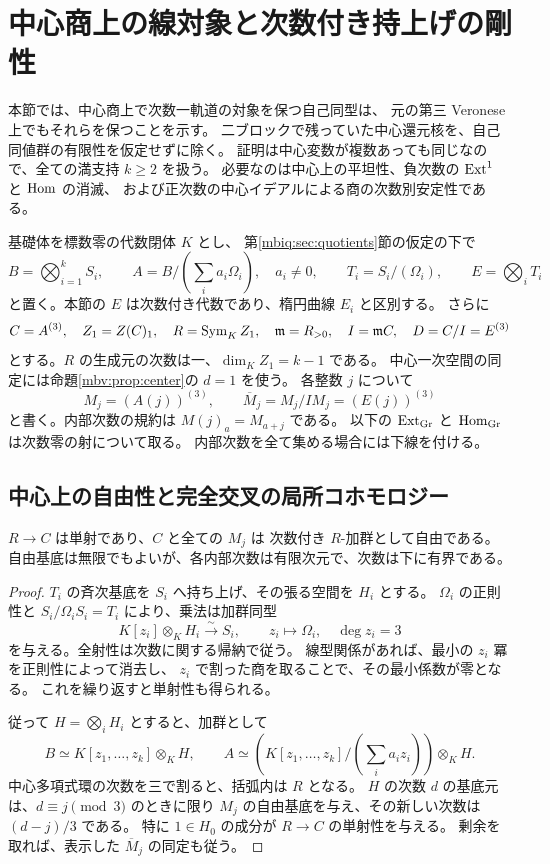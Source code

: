 \section{中心商上の線対象と次数付き持上げの剛性}
\label{mbcr:sec:central-rigidity}

本節では、中心商上で次数一軌道の対象を保つ自己同型は、
元の第三 Veronese 上でもそれらを保つことを示す。
二ブロックで残っていた中心還元核を、自己同値群の有限性を仮定せずに除く。
証明は中心変数が複数あっても同じなので、全ての満支持 $k\geq2$ を扱う。
必要なのは中心上の平坦性、負次数の $\operatorname{Ext}^1$ と $\operatorname{Hom}$ の消滅、
および正次数の中心イデアルによる商の次数別安定性である。

基礎体を標数零の代数閉体 $K$ とし、
第\ref{mbiq:sec:quotients}節の仮定の下で
\[
 B=\bigotimes_{i=1}^kS_i,\qquad
 A=B/\left(\sum_i a_i\Omega_i\right),\quad a_i\ne0,\qquad
 T_i=S_i/(\Omega_i),\qquad E=\bigotimes_iT_i
\]
と置く。本節の $E$ は次数付き代数であり、楕円曲線 $E_i$ と区別する。
さらに
\begin{equation}\label{mbcr:eq:setup}
 C=A^{(3)},\quad Z_1=Z(C)_1,\quad
 R=\operatorname{Sym}_K Z_1,\quad \mathfrak m=R_{>0},\quad I=\mathfrak m C,\quad
 D=C/I=E^{(3)}
\end{equation}
とする。$R$ の生成元の次数は一、$\dim_KZ_1=k-1$ である。
中心一次空間の同定には命題\ref{mbv:prop:center}の $d=1$ を使う。
各整数 $j$ について
\[
 M_j=(A(j))^{(3)},\qquad \overline M_j=M_j/IM_j=(E(j))^{(3)}
\]
と書く。内部次数の規約は $M(j)_a=M_{a+j}$ である。
以下の $\operatorname{Ext}_{\operatorname{Gr}}$ と $\operatorname{Hom}_{\operatorname{Gr}}$ は次数零の射について取る。
内部次数を全て集める場合には下線を付ける。

\subsection{中心上の自由性と完全交叉の局所コホモロジー}

\begin{lemma}[中心多項式環上の自由性]
\label{mbcr:lem:central-free}
$R\to C$ は単射であり、$C$ と全ての $M_j$ は
次数付き $R$-加群として自由である。
自由基底は無限でもよいが、各内部次数は有限次元で、次数は下に有界である。
\end{lemma}
\begin{proof}
$T_i$ の斉次基底を $S_i$ へ持ち上げ、その張る空間を $H_i$ とする。
$\Omega_i$ の正則性と
$S_i/\Omega_iS_i=T_i$ により、乗法は加群同型
\[
 K[z_i]\otimes_KH_i\xrightarrow{\sim}S_i,\qquad z_i\longmapsto\Omega_i,
 \quad\deg z_i=3
\]
を与える。全射性は次数に関する帰納で従う。
線型関係があれば、最小の $z_i$ 冪を正則性によって消去し、
$z_i$ で割った商を取ることで、その最小係数が零となる。
これを繰り返すと単射性も得られる。

従って $H=\bigotimes_iH_i$ とすると、加群として
\[
 B\simeq K[z_1,\ldots,z_k]\otimes_KH,\qquad
 A\simeq
 \left(K[z_1,\ldots,z_k]/\left(\sum_i a_iz_i\right)\right)\otimes_KH .
\]
中心多項式環の次数を三で割ると、括弧内は $R$ となる。
$H$ の次数 $d$ の基底元は、$d\equiv j\pmod3$ のときに限り
$M_j$ の自由基底を与え、その新しい次数は $(d-j)/3$ である。
特に $1\in H_0$ の成分が $R\to C$ の単射性を与える。
剰余を取れば、表示した $\overline M_j$ の同定も従う。
\end{proof}

